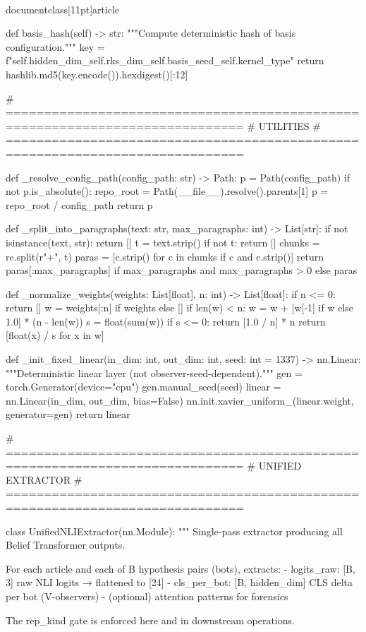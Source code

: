 \\documentclass[11pt]{article}
\begin{document}
\begin{CodeBlock}
    def basis_hash(self) -> str:
        """Compute deterministic hash of basis configuration."""
        key = f"{self.hidden_dim}_{self.rks_dim}_{self.basis_seed}_{self.kernel_type}"
        return hashlib.md5(key.encode()).hexdigest()[:12]


# =============================================================================
# UTILITIES
# =============================================================================

def _resolve_config_path(config_path: str) -> Path:
    p = Path(config_path)
    if not p.is_absolute():
        repo_root = Path(__file__).resolve().parents[1]
        p = repo_root / config_path
    return p


def _split_into_paragraphs(text: str, max_paragraphs: int) -> List[str]:
    if not isinstance(text, str):
        return []
    t = text.strip()
    if not t:
        return []
    chunks = re.split(r"\n\s*\n+", t)
    paras = [c.strip() for c in chunks if c and c.strip()]
    return paras[:max_paragraphs] if max_paragraphs and max_paragraphs > 0 else paras


def _normalize_weights(weights: List[float], n: int) -> List[float]:
    if n <= 0:
        return []
    w = weights[:n] if weights else []
    if len(w) < n:
        w = w + [w[-1] if w else 1.0] * (n - len(w))
    s = float(sum(w))
    if s <= 0:
        return [1.0 / n] * n
    return [float(x) / s for x in w]


def _init_fixed_linear(in_dim: int, out_dim: int, seed: int = 1337) -> nn.Linear:
    """Deterministic linear layer (not observer-seed-dependent)."""
    gen = torch.Generator(device="cpu")
    gen.manual_seed(seed)
    linear = nn.Linear(in_dim, out_dim, bias=False)
    nn.init.xavier_uniform_(linear.weight, generator=gen)
    return linear


# =============================================================================
# UNIFIED EXTRACTOR
# =============================================================================

class UnifiedNLIExtractor(nn.Module):
    """
    Single-pass extractor producing all Belief Transformer outputs.
    
    For each article and each of B hypothesis pairs (bots), extracts:
    - logits_raw: [B, 3] raw NLI logits → flattened to [24]
    - cls_per_bot: [B, hidden_dim] CLS delta per bot (V-observers)
    - (optional) attention patterns for forensics
    
    The rep_kind gate is enforced here and in downstream operations.
    

\end{CodeBlock}
\end{document}
